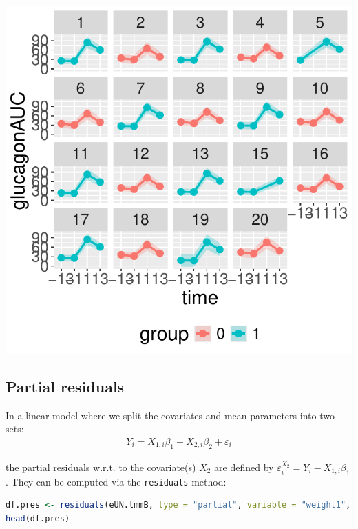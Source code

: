 \documentclass[12pt]{article}
\begin{document}
\begin{minipage}{0.3\linewidth}
\begin{center}
\includegraphics[width=\textwidth]{./figures/fit-autoplot-indiv.pdf}
\end{center}
\end{minipage}

\clearpage
\subsection{Partial residuals}
\label{sec:orgc347b1c}

In a linear model where we split the covariates and mean parameters into two sets:
\begin{align*}
Y_i = X_{1,i} \beta_1 + X_{2,i} \beta_2 + \varepsilon_i
\end{align*}

\noindent the partial residuals w.r.t. to the covariate(s) \(X_2\) are defined
by \(\varepsilon^{X_2}_{i} = Y_i - X_{1,i} \beta_1\). \newline They can be
computed via the \texttt{residuals} method:
\begin{lstlisting}[language=r,numbers=none]
df.pres <- residuals(eUN.lmmB, type = "partial", variable = "weight1", keep.data = TRUE)
head(df.pres)
\end{lstlisting}
\end{document}

